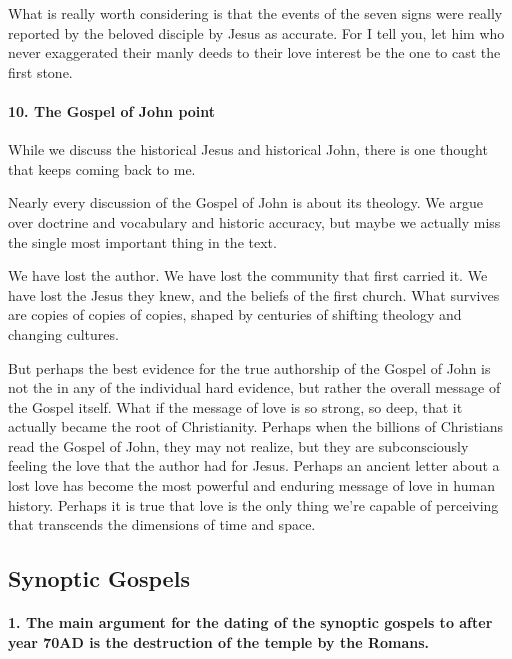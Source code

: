 What is really worth considering is that the events of the seven signs were really reported by the beloved disciple by Jesus as accurate.
For I tell you, let him who never exaggerated their manly deeds to their love interest be the one to cast the first stone.

\paragraph{10.
The Gospel of John point}\label{par:the-gospel-of-john-point}

While we discuss the historical Jesus and historical John, there is one thought that keeps coming back to me.

Nearly every discussion of the Gospel of John is about its theology.
We argue over doctrine and vocabulary and historic accuracy, but maybe we actually miss the single most important thing in the text.

We have lost the author.
We have lost the community that first carried it.
We have lost the Jesus they knew, and the beliefs of the first church.
What survives are copies of copies of copies, shaped by centuries of shifting theology and changing cultures.

But perhaps the best evidence for the true authorship of the Gospel of John is not the in any of the individual hard evidence, but rather the overall message of the Gospel itself.
What if the message of love is so strong, so deep, that it actually became the root of Christianity.
Perhaps when the billions of Christians read the Gospel of John, they may not realize, but they are subconsciously feeling the love that the author had for Jesus.
Perhaps an ancient letter about a lost love has become the most powerful and enduring message of love in human history.
Perhaps it is true that love is the only thing we're capable of perceiving that transcends the dimensions of time and space.

\subsection{Synoptic Gospels}\label{par:synoptic-gospels}

\paragraph{1.
The main argument for the dating of the synoptic gospels to after year 70AD is the destruction of the temple by the Romans.}\label{par:the-main-argument-for-the-dating-of-the-synoptic-gospels-to-after-year-70ad-is-the-destruction-of-the-temple-by-the-romans.}

